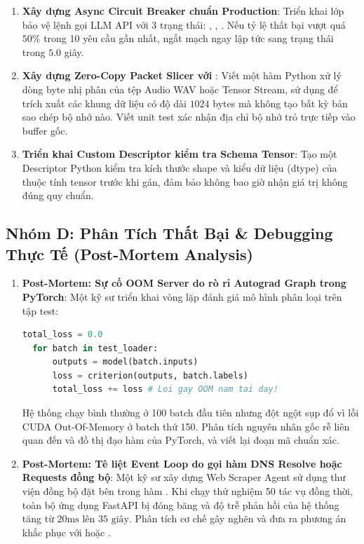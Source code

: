 \begin{enumerate}[label=\textbf{C\arabic*.}]
  \item \textbf{Xây dựng Async Circuit Breaker chuẩn Production}:
  Triển khai lớp  bảo vệ lệnh gọi LLM API với 3 trạng thái: , , . Nếu tỷ lệ thất bại vượt quá $50\%$ trong 10 yêu cầu gần nhất, ngắt mạch ngay lập tức sang trạng thái  trong $5.0$ giây.
  \item \textbf{Xây dựng Zero-Copy Packet Slicer với }:
  Viết một hàm Python xử lý dòng byte nhị phân của tệp Audio WAV hoặc Tensor Stream, sử dụng  để trích xuất các khung dữ liệu có độ dài $1024$ bytes mà không tạo bất kỳ bản sao chép bộ nhớ nào. Viết unit test xác nhận địa chỉ bộ nhớ trỏ trực tiếp vào buffer gốc.
  \item \textbf{Triển khai Custom Descriptor kiểm tra Schema Tensor}:
  Tạo một Descriptor Python kiểm tra kích thước shape và kiểu dữ liệu (dtype) của thuộc tính tensor trước khi gán, đảm bảo không bao giờ nhận giá trị không đúng quy chuẩn.
\end{enumerate}

\subsection{Nhóm D: Phân Tích Thất Bại \& Debugging Thực Tế (Post-Mortem Analysis)}

\begin{enumerate}[label=\textbf{D\arabic*.}]
  \item \textbf{Post-Mortem: Sự cố OOM Server do rò rỉ Autograd Graph trong PyTorch}:
  Một kỹ sư triển khai vòng lặp đánh giá mô hình phân loại trên tập test:
  \begin{lstlisting}[language=Python]
  total_loss = 0.0
  for batch in test_loader:
      outputs = model(batch.inputs)
      loss = criterion(outputs, batch.labels)
      total_loss += loss # Loi gay OOM nam tai day!
  \end{lstlisting}
  Hệ thống chạy bình thường ở 100 batch đầu tiên nhưng đột ngột sụp đổ vì lỗi CUDA Out-Of-Memory ở batch thứ 150. Phân tích nguyên nhân gốc rễ liên quan đến  và đồ thị đạo hàm của PyTorch, và viết lại đoạn mã chuẩn xác.
  \item \textbf{Post-Mortem: Tê liệt Event Loop do gọi hàm DNS Resolve hoặc Requests đồng bộ}:
  Một kỹ sư xây dựng Web Scraper Agent sử dụng thư viện  đồng bộ đặt bên trong hàm . Khi chạy thử nghiệm 50 tác vụ đồng thời, toàn bộ ứng dụng FastAPI bị đóng băng và độ trễ phản hồi của hệ thống tăng từ $20\text{ms}$ lên $35\text{ giây}$. Phân tích cơ chế gây nghẽn và đưa ra phương án khắc phục với  hoặc .
\end{enumerate}

